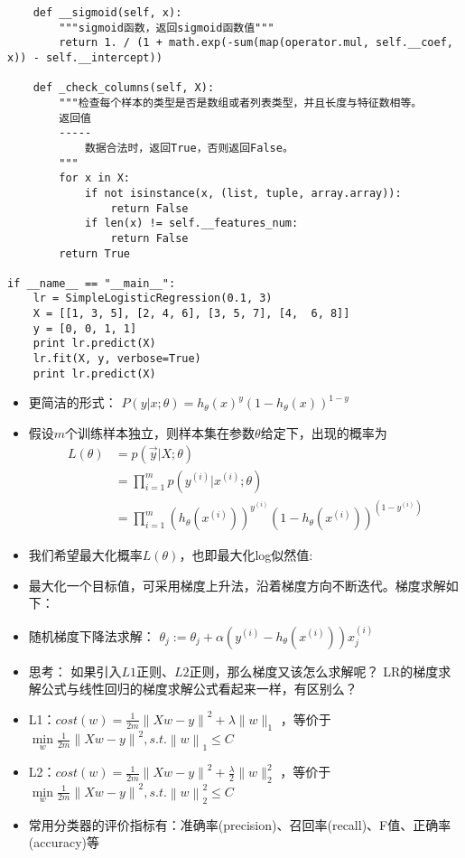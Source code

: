 \documentclass[10pt,a4paper]{ctexbook}
\begin{document}
\begin{verbatim}
    def __sigmoid(self, x):
        """sigmoid函数，返回sigmoid函数值"""
        return 1. / (1 + math.exp(-sum(map(operator.mul, self.__coef, x)) - self.__intercept))

    def _check_columns(self, X):
        """检查每个样本的类型是否是数组或者列表类型，并且长度与特征数相等。
        返回值
        -----
            数据合法时，返回True，否则返回False。
        """
        for x in X:
            if not isinstance(x, (list, tuple, array.array)):
                return False
            if len(x) != self.__features_num:
                return False
        return True

if __name__ == "__main__":
    lr = SimpleLogisticRegression(0.1, 3)
    X = [[1, 3, 5], [2, 4, 6], [3, 5, 7], [4,  6, 8]]
    y = [0, 0, 1, 1]
    print lr.predict(X)
    lr.fit(X, y, verbose=True)
    print lr.predict(X)
\end{verbatim}


\begin{itemize}
\item 更简洁的形式： $P(y|x;\theta)={h_{\theta}(x)}^y(1-h_{\theta}(x))^{1-y}$
\item 假设$m$个训练样本独立，则样本集在参数${\theta}$给定下，出现的概率为
\begin{align*}
L(\theta)&=p(\vec y|X;\theta)\\
         &=\prod_{i=1}^{m}{p(y^{(i)} | x^{(i)};\theta)}\\
         &=\prod_{i=1}^{m}{(h_{\theta}(x^{(i)}))^{y^{(i)}}(1-h_{\theta}(x^{(i)}))^{(1-y^{(i)})}}
\end{align*}

\item 我们希望最大化概率$L({\theta})$，也即最大化log似然值:

\item 最大化一个目标值，可采用梯度上升法，沿着梯度方向不断迭代。梯度求解如下：

\item 随机梯度下降法求解：
\subitem ${\theta}_{j}:={\theta}_{j}+{\alpha}(y^{(i)}-h_{\theta}(x^{(i)}))x_{j}^{(i)}$

\item 思考：
\subitem 如果引入$L1$正则、$L2$正则，那么梯度又该怎么求解呢？
\subitem LR的梯度求解公式与线性回归的梯度求解公式看起来一样，有区别么？

\item L1：$cost(w)={\frac {1}{2m}}\left\|{Xw-y}\right\|^{2}+\lambda\|w\|_{1}$
，等价于
    $\min\limits_{w}{\frac {1}{2m}}\left\|{Xw-y}\right\|^{2}, s.t. \left\|w\right\|_{1}\le{C}$

\item L2：$cost(w)={\frac {1}{2m}}\left\|{Xw-y}\right\|^{2}+{\frac {\lambda}{2}}\|w\|_{2}^{2}$
，等价于
    $\min\limits_{w}{\frac {1}{2m}}\left\|{Xw-y}\right\|^{2}, s.t. \left\|w\right\|_{2}^{2}\le{C}$

\item 常用分类器的评价指标有：准确率(precision)、召回率(recall)、F值、正确率(accuracy)等
\end{itemize}
\end{document}
